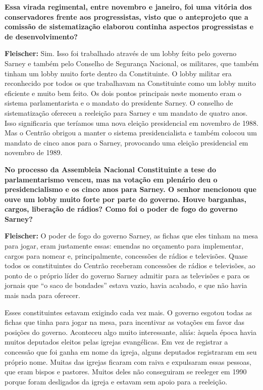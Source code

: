 \textbf{Essa virada regimental, entre novembro e janeiro, foi uma
vitória dos conservadores frente aos progressistas, visto que o
anteprojeto que a comissão de sistematização elaborou continha aspectos
progressistas e de desenvolvimento?}

\textbf{Fleischer:} Sim. Isso foi trabalhado através de um lobby feito
pelo governo Sarney e também pelo Conselho de Segurança Nacional, os
militares, que também tinham um lobby muito forte dentro da
Constituinte. O lobby militar era reconhecido por todos os que
trabalhavam na Constituinte como um lobby muito eficiente e muito bem
feito. Os dois pontos principais neste momento eram o sistema
parlamentarista e o mandato do presidente Sarney. O conselho de
sistematização ofereceu a reeleição para Sarney e um mandato de quatro
anos. Isso significaria que teríamos uma nova eleição presidencial em
novembro de 1988. Mas o Centrão obrigou a manter o sistema
presidencialista e também colocou um mandato de cinco anos para o
Sarney, provocando uma eleição presidencial em novembro de 1989.

\textbf{No processo da Assembleia Nacional Constituinte a tese do
parlamentarismo venceu, mas na votação em plenário deu o
presidencialismo e os cinco anos para Sarney. O senhor mencionou que
ouve um lobby muito forte por parte do governo. Houve barganhas, cargos,
liberação de rádios? Como foi o poder de fogo do governo Sarney?}

\textbf{Fleischer:} O poder de fogo do governo Sarney, as fichas que
eles tinham na mesa para jogar, eram justamente essas: emendas no
orçamento para implementar, cargos para nomear e, principalmente,
concessões de rádios e televisões. Quase todos os constituintes do
Centrão receberam concessões de rádios e televisões, ao ponto de o
próprio líder do governo Sarney admitir para as televisões e para os
jornais que ``o saco de bondades'' estava vazio, havia acabado, e que
não havia mais nada para oferecer.

Esses constituintes estavam exigindo cada vez mais. O governo esgotou
todas as fichas que tinha para jogar na mesa, para incentivar as
votações em favor das posições do governo. Aconteceu algo muito
interessante, aliás: àquela época havia muitos deputados eleitos pelas
igrejas evangélicas. Em vez de registrar a concessão que foi ganha em
nome da igreja, alguns deputados registraram em seu próprio nome. Muitas
das igrejas ficaram com raiva e expulsaram essas pessoas, que eram
bispos e pastores. Muitos deles não conseguiram se reeleger em 1990
porque foram desligados da igreja e estavam sem apoio para a reeleição.


